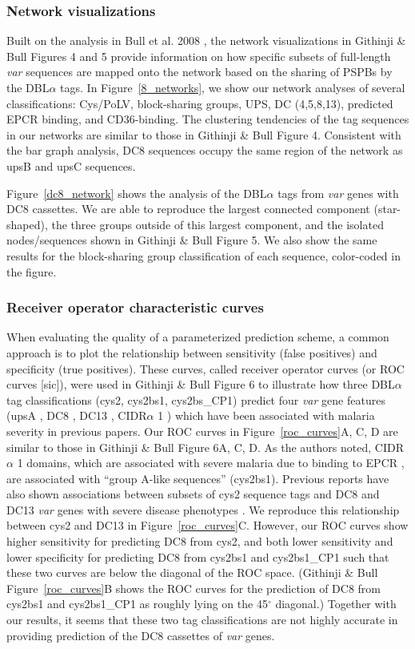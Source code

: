 \documentclass[10pt,twocolumn,superscriptaddress]{revtex4-1}
\newcommand{\var}{{\it var}\xspace}
\newcommand{\dbla}{{DBL$\alpha$}\xspace}
\newcommand{\cidra}{{CIDR$\alpha$}\xspace}
\newcommand{\cp}{{Cys/PoLV}\xspace}
\newcommand{\paper}{{Githinji \& Bull}\xspace}
\begin{document}
\subsubsection{Network visualizations}
Built on the analysis in Bull et al. 2008 \cite{bull2008}, the network visualizations in \paper Figures 4 and 5 provide information on how specific subsets of full-length \var sequences are mapped onto the network based on the sharing of PSPBs by the \dbla tags. In Figure~\ref{8_networks}, we show our network analyses of several classifications: \cp, block-sharing groups, UPS, DC (4,5,8,13), predicted EPCR binding, and CD36-binding. The clustering tendencies of the tag sequences in our networks are similar to those in \paper Figure 4. Consistent with the bar graph analysis, DC8 sequences occupy the same region of the network as upsB and upsC sequences.  

Figure~\ref{dc8_network} shows the analysis of the \dbla tags from \var genes with DC8 cassettes. We are able to reproduce the largest connected component (star-shaped), the three groups outside of this largest component, and the isolated nodes/sequences shown in \paper Figure 5. We also show the same results for the block-sharing group classification of each sequence, color-coded in the figure.


\subsubsection{Receiver operator characteristic curves}
When evaluating the quality of a parameterized prediction scheme, a common approach is to plot the relationship between sensitivity (false positives) and specificity (true positives). These curves, called receiver operator curves (or ROC curves [sic]), were used in \paper Figure 6 to illustrate how three \dbla tag classifications (cys2, cys2bs1, cys2bs\_CP1) predict four \var gene features (upsA \cite{warimwe2012}, DC8 \cite{lavstsen2012} \cite{rask2010}, DC13 \cite{warimwe2012}, \cidra1 \cite{turner2013}) which have been associated with malaria severity in previous papers. Our ROC curves in Figure~\ref{roc_curves}A, C, D are similar to those in \paper Figure 6A, C, D. As the authors noted, \cidra1 domains, which are associated with severe malaria due to binding to EPCR \cite{turner2013}, are associated with ``group A-like sequences'' (cys2bs1). Previous reports have also shown associations between subsets of cys2 sequence tags and DC8 and DC13 \var genes with severe disease phenotypes \cite{warimwe2012}. We reproduce this relationship between cys2 and DC13 in Figure~\ref{roc_curves}C. However, our ROC curves show higher sensitivity for predicting DC8 from cys2, and both lower sensitivity and lower specificity for predicting DC8 from cys2bs1 and cys2bs1\_CP1 such that these two curves are below the diagonal of the ROC space. (\paper Figure~\ref{roc_curves}B shows the ROC curves for the prediction of DC8 from cys2bs1 and cys2bs1\_CP1 as roughly lying on the 45$^{\circ}$ diagonal.) Together with our results, it seems that these two tag classifications are not highly accurate in providing prediction of the DC8 cassettes of \var genes. 
\end{document}
